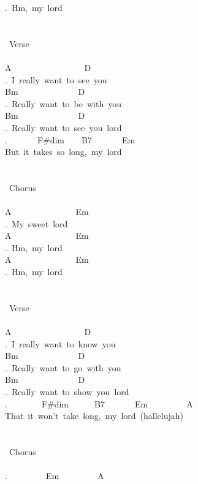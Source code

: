 {.\ Hm,\ my\ lord\\
\\
\\
\lbrack\ Verse\rbrack\\
\\
A\ \ \ \ \ \ \ \ \ \ \ \ \ \ \ \ \ D\ \ \\
.\ I\ really\ want\ to\ see\ you\\
Bm\ \ \ \ \ \ \ \ \ \ \ \ \ \ D\\
.\ Really\ want\ to\ be\ with\ you\\
Bm\ \ \ \ \ \ \ \ \ \ \ \ \ \ D\\
.\ Really\ want\ to\ see\ you\ lord\\
.\ \ \ \ \ \ \ F\#dim\ \ \ \ B7\ \ \ \ \ \ \ Em\ \ \ \ \ \ \ \\
But\ it\ takes\ so\ long,\ my\ lord\\
\\
\\
\lbrack\ Chorus\rbrack\\
\\
A\ \ \ \ \ \ \ \ \ \ \ \ \ \ \ Em\\
.\ My\ sweet\ lord\\
A\ \ \ \ \ \ \ \ \ \ \ \ \ \ \ Em\\
.\ Hm,\ my\ lord\\
A\ \ \ \ \ \ \ \ \ \ \ \ \ \ \ Em\\
.\ Hm,\ my\ lord\\
\\
\\
\lbrack\ Verse\rbrack\\
\\
A\ \ \ \ \ \ \ \ \ \ \ \ \ \ \ \ \ D\\
.\ I\ really\ want\ to\ know\ you\\
Bm\ \ \ \ \ \ \ \ \ \ \ \ \ \ D\\
.\ Really\ want\ to\ go\ with\ you\\
Bm\ \ \ \ \ \ \ \ \ \ \ \ \ \ D\ \\
.\ Really\ want\ to\ show\ you\ lord\\
.\ \ \ \ \ \ \ \ F\#dim\ \ \ \ \ \ B7\ \ \ \ \ \ \ Em\ \ \ \ \ \ \ \ \ A\ \\
That\ it\ won't\ take\ long,\ my\ lord\ (hallelujah)\\
\\
\\
\lbrack\ Chorus\rbrack\\
\\
.\ \ \ \ \ \ \ \ \ Em\ \ \ \ \ \ \ \ \ A\\
}
